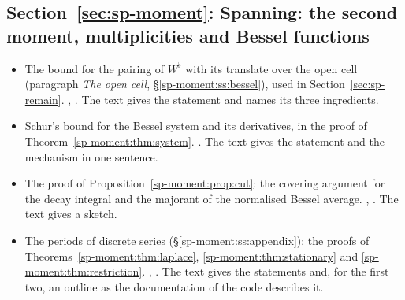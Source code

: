 \subsection*{Section~\ref{sec:sp-moment}: Spanning: the second moment, multiplicities and Bessel functions}
\begin{itemize}[leftmargin=2em,itemsep=1pt]
\item The bound for the pairing of $W^\flat$ with its translate over the open cell (paragraph
  \emph{The open cell}, \S\ref{sp-moment:ss:bessel}), used in Section~\ref{sec:sp-remain}.
  ,
  . The text gives the statement and names its three
  ingredients.
\item Schur's bound for the Bessel system and its derivatives, in the proof of
  Theorem~\ref{sp-moment:thm:system}. . The
  text gives the statement and the mechanism in one sentence.
\item The proof of Proposition~\ref{sp-moment:prop:cut}: the covering argument for the decay
  integral and the majorant of the normalised Bessel average.
  ,
  . The text gives a sketch.
\item The periods of discrete series (\S\ref{sp-moment:ss:appendix}): the proofs of
  Theorems~\ref{sp-moment:thm:laplace}, \ref{sp-moment:thm:stationary} and
  \ref{sp-moment:thm:restriction}. ,
  . The text gives the statements and, for the
  first two, an outline as the documentation of the code describes it.
\end{itemize}

